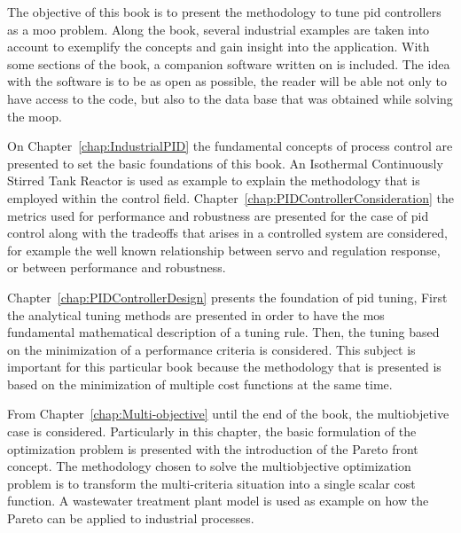 The objective of this book is to present the methodology to tune \gls{pid} controllers as a \gls{moo} problem. Along the book, several industrial examples are taken into account to exemplify the concepts and gain insight into the application. With some sections of the book, a companion software written on \matlab is included. The idea with the software is to be as open as possible, the reader will be able not only to have access to the code, but also to the data base that was obtained while solving the \gls{moop}.

On Chapter~\ref{chap:IndustrialPID} the fundamental concepts of process control are presented to set the basic foundations of this book. An Isothermal Continuously Stirred Tank Reactor is used as example to explain the methodology that is employed within the control field. Chapter~\ref{chap:PIDControllerConsideration} the metrics used for performance and robustness are presented for the case of \gls{pid} control along with the tradeoffs that arises in a controlled system are considered, for example the well known relationship between servo and regulation response, or between performance and robustness.

Chapter~\ref{chap:PIDControllerDesign} presents the foundation of \gls{pid} tuning, First the analytical tuning methods are presented in order to have the mos fundamental mathematical description of a tuning rule. Then, the tuning based on the minimization of a performance criteria is considered. This subject is important for this particular book because the methodology that is presented is based on the minimization of multiple cost functions at the same time.

From Chapter~\ref{chap:Multi-objective} until the end of the book, the multiobjetive case is considered. Particularly in this chapter, the basic formulation of the optimization problem is presented with the introduction of the Pareto front concept. The methodology chosen to solve the multiobjective optimization problem is to transform the multi-criteria situation into a single scalar cost function. A wastewater treatment plant model is used as example on how the Pareto can be applied to industrial processes.

